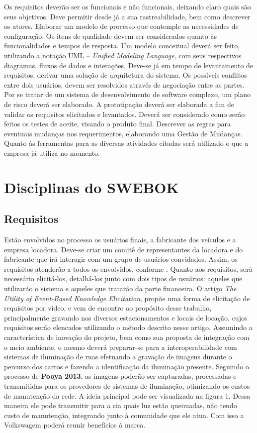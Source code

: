 \documentclass[12pt]{article}
\begin{document}
Os requisitos deverão ser os funcionais e não funcionais, deixando claro quais são seus objetivos. Deve permitir desde já a sua rastreabilidade, bem como descrever os  atores. Elaborar um modelo de processo que contemple as necessidades de configuração.
Os itens de qualidade devem ser considerados quanto às funcionalidades   e tempos de resposta.
Um modelo conceitual deverá ser feito, utilizando a notação UML – \textit{Unified Modeling Language}, com seus respectivos diagramas, fluxos de dados e interações.
Deve-se já em tempo de levantamento de requisitos, derivar uma solução de arquitetura do sistema.
Os possíveis conflitos entre dois usuários, devem ser resolvidos através de negociação entre as partes. 
Por se tratar de um sistema de desenvolvimento de software complexo, um plano de risco deverá ser elaborado. 
A prototipação deverá ser elaborada a fim de validar os requisitos elicitados e levantados.
Deverá ser considerado como serão feitos os testes de aceite, visando o produto final.
Descrever as regras para eventuais mudanças nos requerimentos, elaborando uma Gestão de Mudanças.
Quanto às ferramentas para as diversas atividades citadas será utilizado o que a empresa já utiliza no momento.

\section{Disciplinas do SWEBOK}
\subsection{Requisitos}

Estão envolvidos no processo os usuários finais, a fabricante dos veículos e a empresa locadora. Deve-se criar um comitê de representantes da locadora e do fabricante que irá interagir com um grupo de usuários convidados. Assim, os requisitos atenderão a todos os envolvidos, conforme \cite{Bourque2014}.  
Quanto aos requisitos, será necessário elicitá-los, detalhá-los junto com dois tipos de usuários: aqueles que utilizarão o sistema e aqueles que tratarão da parte financeira. O artigo \textit{The Utility of Event-Based  Knowledge Elicitation}, propõe uma forma de elicitação de requisitos por vídeo, e vem de encontro ao propósito desse trabalho, principalmente gravando nos diversos estacionamentos e locais de locação, cujos requisitos serão elencados utilizando o método descrito nesse artigo.
Assumindo a característica de inovação do projeto, bem como sua proposta de integração com o meio ambiente, o mesmo deverá preparar-se para a interoperabilidade com sistemas de iluminação de ruas efetuando a gravação de imagens durante o percurso dos carros e fazendo a identificação da iluminação presente. Seguindo o processo de \textbf{Pooya 2013}, as imagens poderão ser capturadas, processadas e transmitidas para os provedores de sistemas de iluminação, otimizando os custos de manutenção da rede. A ideia principal pode ser visualizada na figura 1. Dessa maneira ele pode transmitir para a cia quais luz estão queimadas, não tendo custo de manutenção, integrando junto à comunidade que ele atua. Com isso a  Volkswagem poderá reunir benefícios à marca.
\end{document}
